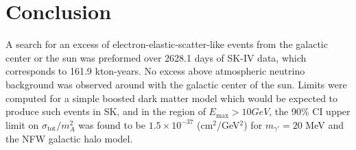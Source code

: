 \section{Conclusion}
\label{sec:conclusion}
A search for an excess of electron-elastic-scatter-like events from the galactic center or the sun was preformed over 2628.1 days of SK-IV data, which corresponds to 161.9 kton-years.  No excess above atmospheric neutrino background was observed around with the galactic center of the sun.  Limits were computed for a simple boosted dark matter model which would be expected to produce such events in SK, and in the region of $E_\textrm{max}>10 GeV$, the 90\% CI upper limit on $\sigma_\textrm{tot}/m_A^2$ was found to be $1.5 \times 10^{-37}$ (cm$^2$/GeV$^2$) for $m_{\gamma '}=20$ MeV and the NFW galactic halo model.